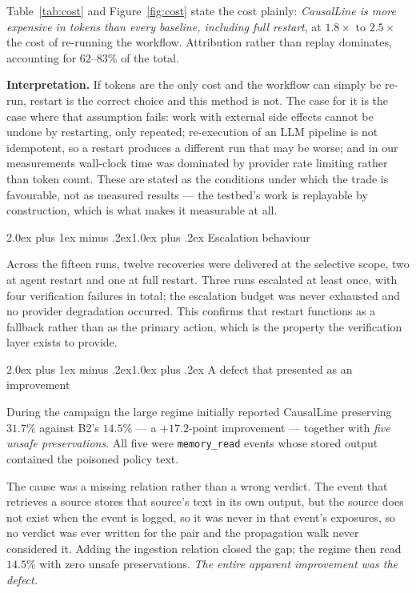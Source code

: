 \documentclass[10pt,twocolumn,a4paper]{article}
\makeatletter
\renewcommand{\subsection}{\@startsection{subsection}{2}{\z@}%
  {2.0ex plus 1ex minus .2ex}{1.0ex plus .2ex}%
  {\normalfont\normalsize\itshape}}
\newcommand{\sys}{CausalLine}
\newcommand{\btwo}{B2}
\makeatother
\begin{document}
Table~\ref{tab:cost} and Figure~\ref{fig:cost} state the cost plainly:
\emph{\sys{} is more expensive in tokens than every baseline, including full
restart}, at $1.8\times$ to $2.5\times$ the cost of re-running the workflow.
Attribution rather than replay dominates, accounting for $62$--$83\%$ of the
total.

\textbf{Interpretation.} If tokens are the only cost and the workflow can
simply be re-run, restart is the correct choice and this method is not. The
case for it is the case where that assumption fails: work with external side
effects cannot be undone by restarting, only repeated; re-execution of an LLM
pipeline is not idempotent, so a restart produces a different run that may be
worse; and in our measurements wall-clock time was dominated by provider rate
limiting rather than token count. These are stated as the conditions under
which the trade is favourable, not as measured results --- the testbed's work is
replayable by construction, which is what makes it measurable at all.

\subsection{Escalation behaviour}

Across the fifteen runs, twelve recoveries were delivered at the selective
scope, two at agent restart and one at full restart. Three runs escalated at
least once, with four verification failures in total; the escalation budget was
never exhausted and no provider degradation occurred.
This confirms that restart functions as a fallback rather than as the primary
action, which is the property the verification layer exists to provide.

\subsection{A defect that presented as an improvement}
\label{sec:defect}

During the campaign the large regime initially reported \sys{} preserving
$31.7\%$ against \btwo{}'s $14.5\%$ --- a $+17.2$-point improvement --- together
with \emph{five unsafe preservations}. All five were \texttt{memory\_read}
events whose stored output contained the poisoned policy text.

The cause was a missing relation rather than a wrong verdict. The event that
retrieves a source stores that source's text in its own output, but the source
does not exist when the event is logged, so it was never in that event's
exposures, so no verdict was ever written for the pair and the propagation walk
never considered it. Adding the ingestion relation closed the gap; the regime
then read $14.5\%$ with zero unsafe preservations. \emph{The entire apparent
improvement was the defect.}
\end{document}
